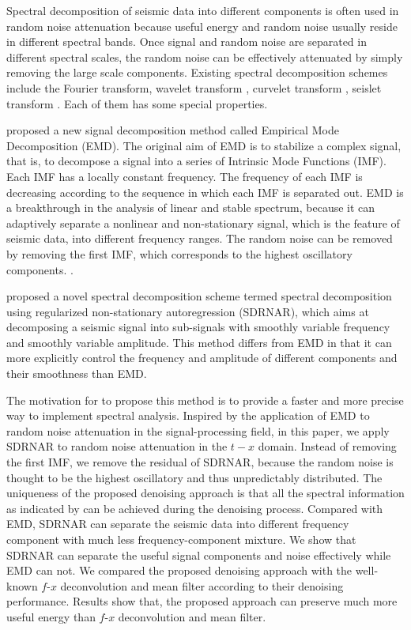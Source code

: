 Spectral decomposition of seismic data into different components is often used in random noise attenuation because useful energy and random noise usually reside in different spectral bands. Once signal and random noise are separated in different spectral scales, the random noise can be effectively attenuated by simply removing the large scale components. Existing spectral decomposition schemes include the Fourier transform, wavelet transform \cite[]{mallat,wavelet}, curvelet transform \cite[]{curvelet}, seislet transform \cite[]{seislet,yangkang20142}. Each of them has some special properties. 

\cite{emd} proposed a new signal decomposition method called Empirical Mode Decomposition (EMD). The original aim of EMD is to stabilize a complex signal, that is, to decompose a signal into a series of Intrinsic Mode Functions (IMF). Each IMF has a locally constant frequency. The frequency of each IMF is decreasing according to the sequence in which each IMF is separated out. EMD is a breakthrough in the analysis of linear and stable spectrum, because it can adaptively separate a nonlinear and non-stationary signal, which is the feature of seismic data, into different frequency ranges. The random noise can be removed by removing the first IMF, which corresponds to the highest oscillatory components. .

\cite{sdrnar} proposed a novel spectral decomposition scheme termed spectral decomposition using regularized non-stationary autoregression (SDRNAR), which aims at decomposing a seismic signal into sub-signals with smoothly variable frequency and smoothly variable amplitude. This method differs from EMD in that it can more explicitly control the frequency and amplitude of different components and their smoothness than EMD. 

The motivation for \cite{sdrnar} to propose this method is to provide a faster and more precise way to implement spectral analysis. Inspired by the application of EMD to random noise attenuation in the signal-processing field, in this paper, we apply SDRNAR to random noise attenuation in the $t-x$ domain. Instead of removing the first IMF, we remove the residual of SDRNAR, because the random noise is thought to be the highest oscillatory and thus unpredictably distributed.  The uniqueness of the proposed denoising approach is that all the spectral information as indicated by \cite{sdrnar} can be achieved during the denoising process. Compared with EMD, SDRNAR can separate the seismic data into different frequency component with much less frequency-component mixture. We show that SDRNAR can separate the useful signal components and noise effectively while EMD can not. We compared the proposed denoising approach with the well-known $f$-$x$ deconvolution and mean filter according to their denoising performance. Results show that, the proposed approach can preserve much more useful energy than $f$-$x$ deconvolution and mean filter. 

